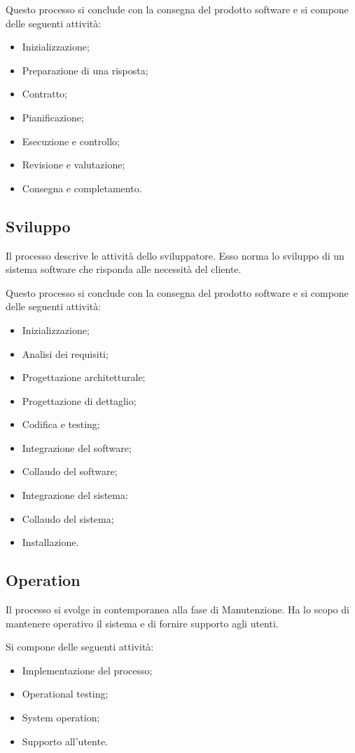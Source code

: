 Questo processo si conclude con la consegna del prodotto software e si compone delle seguenti attività:

\begin{itemize}
    \item Inizializzazione;
    \item Preparazione di una risposta;
    \item Contratto;
    \item Pianificazione;
    \item Esecuzione e controllo;
    \item Revisione e valutazione;
    \item Consegna e completamento.
\end{itemize}

\subsection{Sviluppo}

Il processo descrive le attività dello sviluppatore. Esso norma lo sviluppo di un sistema software che risponda alle necessità del cliente.

Questo processo si conclude con la consegna del prodotto software e si compone delle seguenti attività:

\begin{itemize}
    \item Inizializzazione;
    \item Analisi dei requisiti;
    \item Progettazione architetturale;
    \item Progettazione di dettaglio;
    \item Codifica e testing;
    \item Integrazione del software;
    \item Collaudo del software;
    \item Integrazione del sistema:
    \item Collaudo del sistema;
    \item Installazione.
\end{itemize}

\subsection{Operation}
Il processo si svolge in contemporanea alla fase di Manutenzione. Ha lo scopo di mantenere operativo il sistema e di fornire supporto agli utenti.

Si compone delle seguenti attività:
\begin{itemize}
    \item Implementazione del processo;
    \item Operational testing;
    \item System operation;
    \item Supporto all'utente.
\end{itemize}

